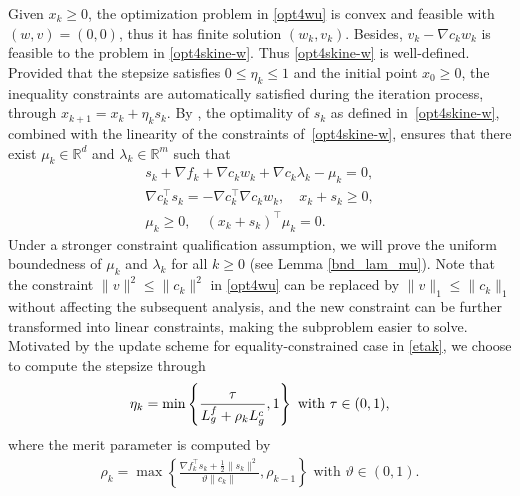 \documentclass[11pt]{article}
\newcommand{\R}{\mathbb{R}}
\newcommand{\be}{\begin{equation}}
\newcommand{\ee}{\end{equation}}
\begin{document}
Given \(x_k \geq 0\), the optimization problem in \eqref{opt4wu} is convex and   feasible with \((w,v) = (0,0)\), thus it has finite solution $(w_k,v_k)$. Besides, 
$v_k-\nabla c_k w_k $ is  feasible to the problem in \eqref{opt4skine-w}. Thus \eqref{opt4skine-w} is well-defined.  Provided that the stepsize satisfies \(0\le \eta_k \le 1\) and the initial point \(x_0 \geq 0\), the inequality constraints are automatically satisfied during the iteration process, through \(x_{k+1} = x_k + \eta_k s_k\). 
By \cite[Lemma 12.8]{nocedal2006numerical}, the optimality of $s_k$ as defined in~\eqref{opt4skine-w}, combined with the linearity of the constraints of~\eqref{opt4skine-w}, ensures that there exist  \(\mu_k \in \R^d\) and \(\lambda_k \in \R^m\) such that
    \be\begin{aligned}\label{multiplier}
        s_k + \nabla f_k + \nabla c_k w_k + \nabla c_k \lambda_k - \mu_k = 0,\\
        \nabla c_k^\top s_k=-\nabla c_k^\top \nabla c_k w_k,\quad  x_k +s_k\ge0,\\
       \mu_k\ge0,\quad  (x_k + s_k)^\top \mu_k = 0.
    \end{aligned}\ee
Under a stronger constraint qualification assumption, we will prove the uniform boundedness of $\mu_k$ and $\lambda_k$ for all $k\ge 0$ (see Lemma \ref{bnd_lam_mu}). Note that the constraint \(\|v\|^2 \leq \|c_k\|^2\) in \eqref{opt4wu} can be replaced by \(\|v\|_1 \leq \|c_k\|_1\) without affecting the subsequent analysis, and the new constraint can be further transformed into linear constraints, making the subproblem easier to solve. Motivated by the update scheme for equality-constrained case in \eqref{etak}, we choose to compute the stepsize through 
\begin{align}\label{etak-2}
    \eta_k = \min \left\{\frac{\tau}{L_g^f + \rho_k L_g^c}, 1\right\}~{\rm with}~\tau \in (0,1),
\end{align}
where the merit parameter is computed by
\begin{align}\label{eq:rhok-2}
    \rho_k = \max \left\{ \frac{\nabla f_k^\top s_k + \frac{1}{2}\|s_k\|^2}{\vartheta \|c_k\|}, \rho_{k-1} \right\}  \mbox{ with } \vartheta \in(0,1).
\end{align}


\end{document}
